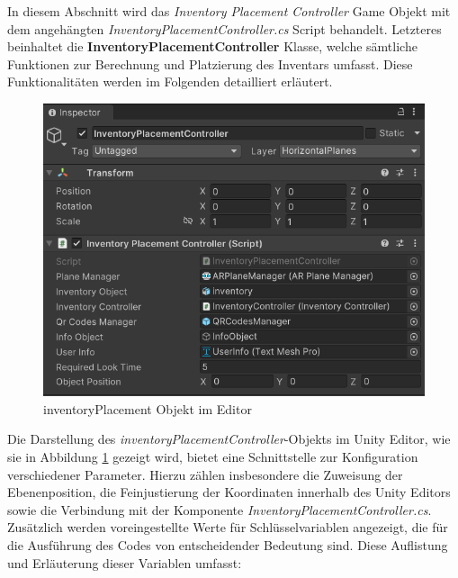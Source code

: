 In diesem Abschnitt wird das \textit{Inventory Placement Controller} Game Objekt mit dem angehängten
\textit{InventoryPlacementController.cs} Script behandelt. Letzteres beinhaltet die \textbf{InventoryPlacementController}
Klasse, welche sämtliche Funktionen zur Berechnung und Platzierung des Inventars umfasst. Diese Funktionalitäten werden
im Folgenden detailliert erläutert.

\begin{figure}[H]
\centering
\includegraphics[scale=0.8]{images/invPlace_Editor}
\caption{inventoryPlacement Objekt im Editor}
\label{fig:inventoryPlacementController_Editor}
\end{figure}

Die Darstellung des \textit{inventoryPlacementController}-Objekts im Unity Editor, wie sie in Abbildung \ref{fig:inventoryPlacementController_Editor}
gezeigt wird, bietet eine Schnittstelle zur Konfiguration verschiedener Parameter. Hierzu zählen insbesondere die Zuweisung
der Ebenenposition, die Feinjustierung der Koordinaten innerhalb des Unity Editors sowie die Verbindung mit der Komponente
\textit{InventoryPlacementController.cs}. Zusätzlich werden voreingestellte Werte für Schlüsselvariablen angezeigt, die
für die Ausführung des Codes von entscheidender Bedeutung sind. Diese Auflistung und Erläuterung dieser Variablen umfasst:

